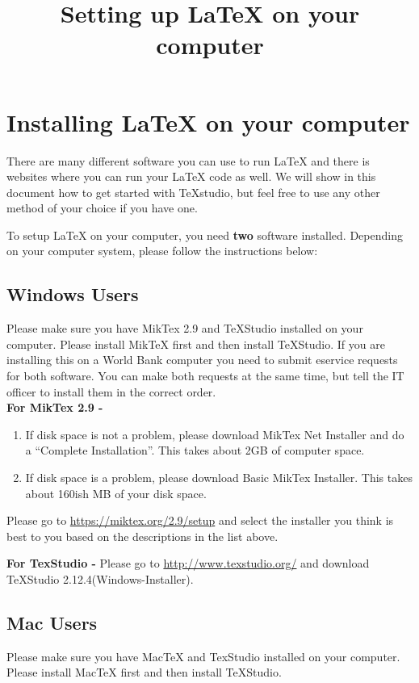 \documentclass[]{article}
\title{Setting up {\LaTeX} on your computer}
\begin{document}
\maketitle
\section*{Installing {\LaTeX} on your computer}
There are many different software you can use to run {\LaTeX} and there is websites where you can run your {\LaTeX} code as well. We will show in this document how to get started with TeXstudio, but feel free to use any other method of your choice if you have one.

To setup {\LaTeX} on your computer, you need \textbf{two} software installed. Depending on your computer system, please follow the instructions below:

\subsection*{Windows Users}
Please make sure you have MikTex 2.9 and TeXStudio installed on your computer. Please install MikTeX first and then install TeXStudio. If you are installing this on a World Bank computer you need to submit eservice requests for both software. You can make both requests at the same time, but tell the IT officer to install them in the correct order. \\

\textbf{For MikTex 2.9 -}
\begin{enumerate}
\item If disk space is not a problem, please download MikTex Net Installer and do a ``Complete Installation''. This takes about 2GB of computer space. 

\item If disk space is a problem, please download Basic MikTex Installer. This takes about 160ish MB of your disk space. 
\end{enumerate}

Please go to \url{https://miktex.org/2.9/setup} and select the installer you think is best to you based on the descriptions in the list above.

\textbf{For TexStudio -  }
Please go to \url{http://www.texstudio.org/} and download TeXStudio 2.12.4(Windows-Installer). 

\subsection*{Mac Users}
Please make sure you have MacTeX and TexStudio installed on your computer. Please install MacTeX first and then install TeXStudio.  \\
\end{document}
